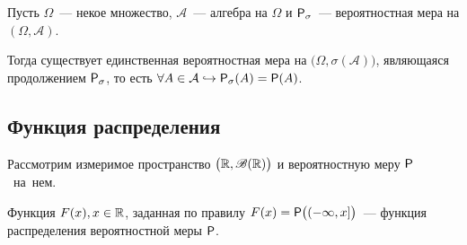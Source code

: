 \begin{theorem}[Каратеодори][б/д]
	Пусть $\Omega$~--- некое множество, $\mathcal{A}$~--- алгебра на $\Omega$ и $\P_\sigma$~--- вероятностная мера на $(\Omega, \mathcal{A})$. 
	
	Тогда существует единственная вероятностная мера на $\big(\Omega, \sigma(\mathcal{A}) \big)$, являющаяся продолжением $\P_\sigma$, то есть  $ \forall A \in \mathcal{A} \hookrightarrow \P_\sigma(A) = \P(A)$.
\end{theorem}


\subsection{Функция распределения}

Рассмотрим измеримое пространство $\big(\R, \B(\R)\big)$ и вероятностную меру $\P$~на~нем.

\begin{definition}
	Функция $F(x), x \in \R$, заданная по правилу $F(x) = \P \big( (-\infty, x] \big)$~--- функция распределения вероятностной меры  $\P$.
\end{definition}

